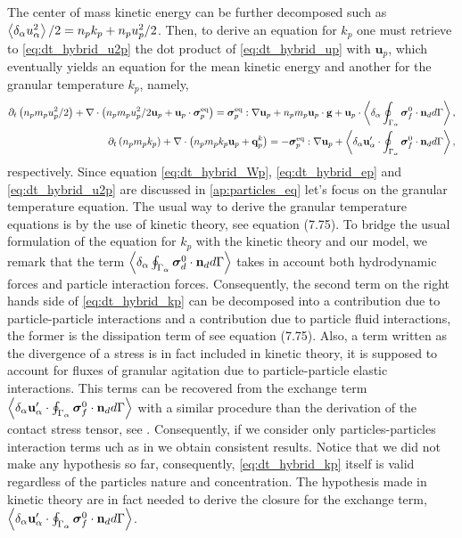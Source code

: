 The center of mass kinetic energy can be further decomposed such as $\left<\delta_\alpha u_\alpha^2\right>/2 = n_p k_p + n_p u_p^2/2$. 
Then, to derive an equation for $k_p$ one must retrieve to \ref{eq:dt_hybrid_u2p} the dot product of \ref{eq:dt_hybrid_up} with $\textbf{u}_p$, which eventually yields an equation for the mean kinetic energy and another for the granular temperature $k_p$, namely,
\begin{align}
    \label{eq:dt_hybrid_up2}
\partial_t \left(n_p m_p u_p^2/ 2\right)
    + \mathbf{\nabla}\cdot \left(n_p
    m_p u_p^2/ 2 \textbf{u}_p 
    + \textbf{u}_p \cdot \bm{\sigma}_p^\text{eq}
    \right)
    = 
    \bm{\sigma}_p^\text{eq}  :\mathbf{\nabla} \textbf{u}_p
    +  n_p m_p \textbf{u}_p \cdot 
     \textbf{g}
    + \textbf{u}_p \cdot \left<\delta_\alpha \oint_{\Gamma_\alpha} {\bm{\sigma}_f^0 \cdot \textbf{n}_d} d\Gamma\right>,\\
    \label{eq:dt_hybrid_kp}
    \partial_t \left(n_p m_p k_p\right)
    + \mathbf{\nabla}\cdot \left(n_p
    m_p k_p \textbf{u}_p 
    + \textbf{q}^k_p
    \right)
    = 
    - \bm{\sigma}_p^\text{eq}  :\mathbf{\nabla} \textbf{u}_p
    + \left<\delta_\alpha \textbf{u}_\alpha'\cdot\oint_{\Gamma_\alpha} \bm{\sigma}_f^0 \cdot \textbf{n}_d d\Gamma\right>,
\end{align}
respectively.
Since equation \ref{eq:dt_hybrid_Wp}, \ref{eq:dt_hybrid_ep} and \ref{eq:dt_hybrid_u2p} are discussed in \ref{ap:particles_eq} let's focus on the granular temperature equation. 
The usual way to derive the granular temperature equations is by the use of kinetic theory, see \citet[Chapter 7 and 9]{rao2008introduction} equation (7.75). 
To bridge the usual formulation of the equation for $k_p$ with the kinetic theory and our model, we remark that the term $\left<\delta_\alpha \oint_{\Gamma_\alpha} \bm{\sigma}_d^0 \cdot \textbf{n}_d d\Gamma\right>$ takes in account both hydrodynamic forces and particle interaction forces. 
Consequently, the second term on the right hands side of \ref{eq:dt_hybrid_kp} can be decomposed into a contribution due to particle-particle interactions and a contribution due to particle fluid interactions, the former is the dissipation term of see \citet[Chapter 7 and 9]{rao2008introduction} equation (7.75). 
Also, a term written as the divergence of a stress is in fact included in kinetic theory, it is supposed to account for fluxes of granular agitation due to particle-particle elastic interactions. 
This terms can be recovered from the exchange term $\left<\delta_\alpha \textbf{u}_\alpha'\cdot\oint_{\Gamma_\alpha} \bm{\sigma}_f^0 \cdot \textbf{n}_d d\Gamma\right>$ with a similar procedure than the derivation of the contact stress tensor, see \citet{scorsim2021particle}. 
Consequently, if we consider only particles-particles interaction terms uch as in \citet{rao2008introduction} we obtain consistent results. 
Notice that we did not make any hypothesis so far, consequently, \ref{eq:dt_hybrid_kp} itself is valid regardless of the particles nature and concentration.
The hypothesis made in kinetic theory are in fact needed to derive the closure for the exchange term, $\left<\delta_\alpha \textbf{u}_\alpha'\cdot\oint_{\Gamma_\alpha} \bm{\sigma}_f^0 \cdot \textbf{n}_d d\Gamma\right>$. 

